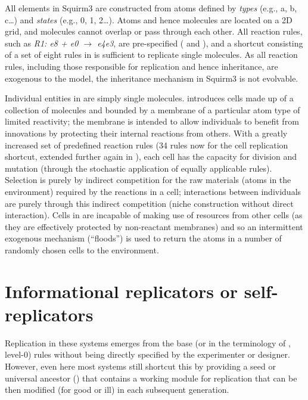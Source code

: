 All elements in Squirm3 are constructed from atoms defined by \emph{types} (e.g., a, b, c\dots) and \emph{states} (e.g., 0, 1, 2\dots). Atoms and hence molecules are located on a 2D grid, and molecules cannot overlap or pass through each other. All reaction rules, such as \emph{R1: e8 + e0 $\rightarrow$ e4e3}, are pre-specified (\textcite[p.4]{Hutton2007} and \textcite[p.49]{Faulconbridge2011}), and a shortcut consisting of a set of eight rules in \textcite{Hutton2002} is sufficient to replicate single molecules. As all reaction rules, including those responsible for replication and hence inheritance, are exogenous to the model, the inheritance mechanism in Squirm3 is not evolvable. 

Individual entities in \textcite{Hutton2002} are simply single molecules. \Textcite{Hutton2007} introduces cells made up of a collection of molecules and bounded by a membrane of a particular atom type of limited reactivity; the membrane is intended to allow individuals to benefit from innovations by protecting their internal reactions from others. With a greatly increased set of predefined reaction rules (34 rules now for the cell replication shortcut, extended further again in \textcite{Lucht2012}), each cell has the capacity for division and mutation (through the stochastic application of equally applicable rules).  Selection is purely by indirect competition for the raw materials (atoms in the environment) required by the reactions in a cell; interactions between individuals are purely through this indirect competition (niche construction without direct interaction). Cells in \textcite{Hutton2007} are incapable of making use of resources from other cells (as they are effectively protected by non-reactant membranes) and so an intermittent exogenous mechanism (``floods'') is used to return the atoms in a number of randomly chosen cells to the environment.

\section{Informational replicators or self-replicators}
Replication in these systems emerges from the base (or in the terminology of \textcite{BanzhafBaumgaertnerBeslonEtAl2016}, level-0) rules without being directly specified by the experimenter or designer. However, even here most systems still shortcut this by providing a seed or universal ancestor (\eg \textcite{Ofria2004}) that contains a working module for replication that can be then modified (for good or ill) in each subsequent generation.

